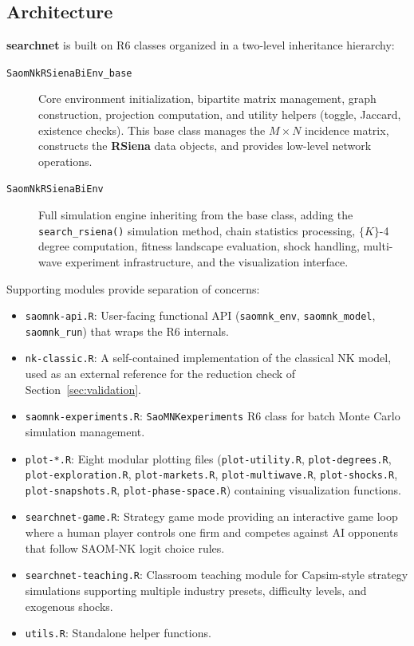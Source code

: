 \documentclass[
]{article}
\begin{document}
\subsection{Architecture}\label{sec:architecture}

\textbf{searchnet} is built on \textsf{R6} classes organized in a
two-level inheritance hierarchy:

\begin{description}
\item[\texttt{SaomNkRSienaBiEnv\_base}] Core environment initialization,
  bipartite matrix management, graph construction, projection computation, and
  utility helpers (toggle, Jaccard, existence checks).  This base class
  manages the $M \times N$ incidence matrix, constructs the \textbf{RSiena} data
  objects, and provides low-level network operations.

\item[\texttt{SaomNkRSienaBiEnv}] Full simulation engine inheriting from the
  base class, adding the \texttt{search\_rsiena()} simulation method, chain
  statistics processing, $\{K\}$-4 degree computation, fitness landscape
  evaluation, shock handling, multi-wave experiment infrastructure, and the
  visualization interface.
\end{description}

Supporting modules provide separation of concerns:

\begin{itemize}
\item \texttt{saomnk-api.R}: User-facing functional API (\texttt{saomnk\_env},
  \texttt{saomnk\_model}, \texttt{saomnk\_run}) that wraps the R6 internals.
\item \texttt{nk-classic.R}: A self-contained implementation of the classical
  NK model, used as an external reference for the reduction check of
  Section~\ref{sec:validation}.
\item \texttt{saomnk-experiments.R}: \texttt{SaoMNKexperiments} R6 class for batch
  Monte Carlo simulation management.
\item \texttt{plot-*.R}: Eight modular plotting files (\texttt{plot-utility.R},
  \texttt{plot-degrees.R}, \texttt{plot-exploration.R}, \texttt{plot-markets.R},
  \texttt{plot-multiwave.R}, \texttt{plot-shocks.R}, \texttt{plot-snapshots.R},
  \texttt{plot-phase-space.R}) containing visualization functions.
\item \texttt{searchnet-game.R}: Strategy game mode providing an interactive
  game loop where a human player controls one firm and competes against AI
  opponents that follow SAOM-NK logit choice rules.
\item \texttt{searchnet-teaching.R}: Classroom teaching module for Capsim-style
  strategy simulations supporting multiple industry presets, difficulty
  levels, and exogenous shocks.
\item \texttt{utils.R}: Standalone helper functions.
\end{itemize}
\end{document}
